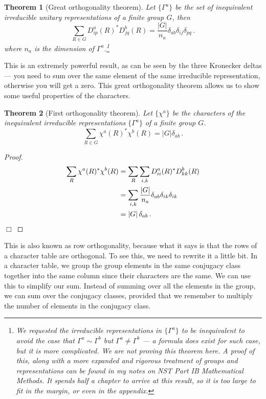 \documentclass{article}
\theoremstyle{plain}\theoremheaderfont{\normalfont\itshape}\theorembodyfont{\rmfamily}\theoremseparator{.}\newtheorem*{rem}{Remark}\newtheorem*{ex}{Example}\newtheorem*{proof}{Proof}\newtheorem*{altp}{Alternative proof}
\theoremstyle{plain}\theoremheaderfont{\normalfont\bfseries}\theorembodyfont{\rmfamily}\theoremseparator{.}\newtheorem{thm}{Theorem}[section]\newtheorem{lem}[thm]{Lemma}\newtheorem{prop}[thm]{Proposition}\newtheorem*{cor}{Corollary}\newtheorem{defn}[thm]{Definition}\newtheorem{clm}[thm]{Claim}\newtheorem{clminproof}{Claim}\newtheorem*{law}{Law}\newtheorem{pos}[thm]{Postulate}
\theoremstyle{break}\theoremheaderfont{\normalfont\itshape}\theorembodyfont{\rmfamily}\theoremseparator{.\medskip}\newtheorem*{proofskip}{Proof}\newtheorem*{exs}{Examples}\newtheorem*{rems}{Remarks}
\theoremstyle{break}\theoremheaderfont{\normalfont\bfseries}\theorembodyfont{\rmfamily}\theoremseparator{.\medskip}\newtheorem{lemskip}[thm]{Lemma}\newtheorem{defnskip}[thm]{Definition}\newtheorem{propskip}[thm]{Proposition}\newtheorem{thmskip}[thm]{Theorem}
\numberwithin{equation}{section}
\newcommand{\qed}{\hfill\ensuremath{\Box}}
\newcommand{\abs}[1]{\left| #1 \right|}
\begin{document}
    \begin{thm}[Great orthogonality theorem]
        Let \(\{\Gamma^{a}\}\) be the set of inequivalent irreducible unitary representations of a finite group \(G\), then
        \begin{equation}
            \sum_{R\in G}D_{ip}^{a}(R)^* D_{jq}^{b}(R)=\frac{\abs{G}}{n_a}\delta_{ab}\delta_{ij}\delta_{pq}\,.
        \end{equation}
        where \(n_a\) is the dimension of \(\Gamma^a\).\footnote{We requested the irreducible representations in \(\{\Gamma^{a}\}\) to be inequivalent to avoid the case that \(\Gamma^a\sim\Gamma^b\) but \(\Gamma^a\ne\Gamma^b\) --- a formula does exist for such case, but it is more complicated. We are not proving this theorem here. A proof of this, along with a more expanded and rigorous treatment of groups and representations can be found in my notes on NST Part IB Mathematical Methods. It spends half a chapter to arrive at this result, so it is too large to fit in the margin, or even in the appendix.}
    \end{thm}

    This is an extremely powerful result, as can be seen by the three Kronecker deltas --- you need to sum over the same element of the same irreducible representation, otherwise you will get a zero. This great orthogonality theorem allows us to show some useful properties of the characters.

    \begin{thm}[First orthogonality theorem]
        Let \(\{\chi^a\}\) be the characters of the inequivalent irreducible representations \(\{\Gamma^a\}\) of a finite group \(G\).
        \begin{equation}
            \sum_{R\in G}\chi^a(R)^*\chi^b(R)=\abs{G}\delta_{ab}\,.
        \end{equation}
    \end{thm}
    \begin{proof}
        \begin{align}
            \sum_{R}\chi^a(R)^*\chi^b(R)&=\sum_{R}\sum_{i,k}D_{ii}^{a}(R)^*D_{kk}^{b}(R)\notag\\
            &=\sum_{i,k}\frac{\abs{G}}{n_a}\delta_{ab}\delta_{ik}\delta_{ik}\notag\\
            &=\abs{G}\delta_{ab}\,.
        \end{align}\qed
    \end{proof}

    This is also known as row orthogonality, because what it says is that the rows of a character table are orthogonal. To see this, we need to rewrite it a little bit. In a character table, we group the group elements in the same conjugacy class together into the same column since their characters are the same. We can use this to simplify our sum. Instead of summing over all the elements in the group, we can sum over the conjugacy classes, provided that we remember to multiply the number of elements in the conjugacy class.
\end{document}
